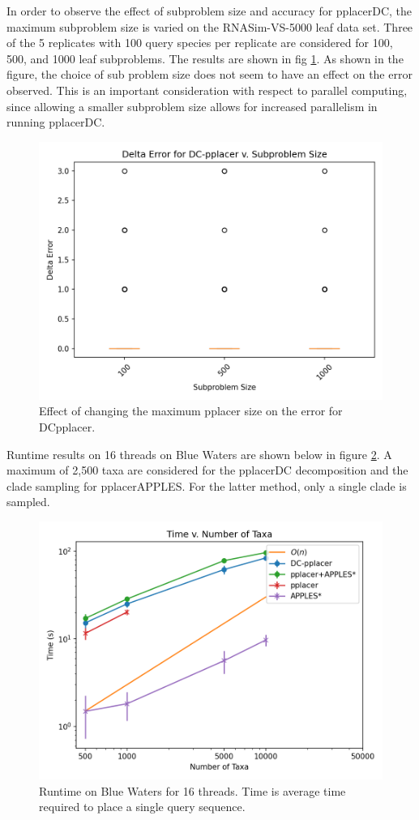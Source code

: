 \documentclass[10pt]{article}
\begin{document}
In order to observe the effect of subproblem size and accuracy for pplacerDC,
the maximum subproblem size is varied on the RNASim-VS-5000 leaf data set.
Three of the 5 replicates with 100 query species per replicate are
considered for 100, 500, and 1000 leaf subproblems.
The results are shown in fig \ref{fig:varying-size}.
As shown in the figure, the choice of sub problem size does not seem
to have an effect on the error observed.
This is an important consideration with respect to parallel computing,
since allowing a smaller subproblem size allows
for increased parallelism in running pplacerDC.
\begin{figure}[h]
\centering
\includegraphics[width=\textwidth]{Figs/varying-subproblem-size.png}
\caption{Effect of changing the maximum pplacer size on the error for DCpplacer.}
\label{fig:varying-size}
\end{figure}
Runtime results on 16 threads on Blue Waters are shown below in figure \ref{fig:timing-results}.
A maximum of 2,500 taxa are considered for the pplacerDC decomposition and the clade
sampling for pplacerAPPLES.
For the latter method, only a single clade is sampled.
\begin{figure}[h]
\centering
\includegraphics[width=\textwidth]{Figs/VS-timing-results-BW.png}
\caption{Runtime on Blue Waters for 16 threads. Time is average time required to place a single query sequence.}
\label{fig:timing-results}
\end{figure}
\end{document}
